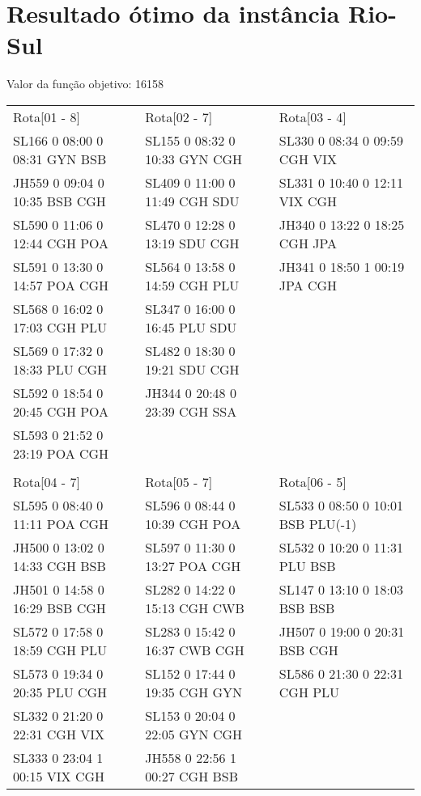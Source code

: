\chapter{Resultado ótimo da instância Rio-Sul}\label{anx:resultriosul}

Valor da função objetivo: 16158

\begin{scriptsize}

\begin{longtable}{l l l}

Rota[01 - 8]  & Rota[02 - 7]  & Rota[03 - 4] \\
SL166  0 08:00 0 08:31 GYN BSB & SL155  0 08:32 0 10:33 GYN CGH & SL330  0 08:34 0 09:59 CGH VIX\\
JH559  0 09:04 0 10:35 BSB CGH & SL409  0 11:00 0 11:49 CGH SDU & SL331  0 10:40 0 12:11 VIX CGH\\
SL590  0 11:06 0 12:44 CGH POA & SL470  0 12:28 0 13:19 SDU CGH & JH340  0 13:22 0 18:25 CGH JPA\\
SL591  0 13:30 0 14:57 POA CGH & SL564  0 13:58 0 14:59 CGH PLU & JH341  0 18:50 1 00:19 JPA CGH\\
SL568  0 16:02 0 17:03 CGH PLU & SL347  0 16:00 0 16:45 PLU SDU & \\
SL569  0 17:32 0 18:33 PLU CGH & SL482  0 18:30 0 19:21 SDU CGH & \\
SL592  0 18:54 0 20:45 CGH POA & JH344  0 20:48 0 23:39 CGH SSA & \\
SL593  0 21:52 0 23:19 POA CGH &  & \\

& & \\

Rota[04 - 7]  & Rota[05 - 7]  & Rota[06 - 5] \\
SL595  0 08:40 0 11:11 POA CGH & SL596  0 08:44 0 10:39 CGH POA & SL533  0 08:50 0 10:01 BSB PLU(-1)\\
JH500  0 13:02 0 14:33 CGH BSB & SL597  0 11:30 0 13:27 POA CGH & SL532  0 10:20 0 11:31 PLU BSB\\
JH501  0 14:58 0 16:29 BSB CGH & SL282  0 14:22 0 15:13 CGH CWB & SL147  0 13:10 0 18:03 BSB BSB\\
SL572  0 17:58 0 18:59 CGH PLU & SL283  0 15:42 0 16:37 CWB CGH & JH507  0 19:00 0 20:31 BSB CGH\\
SL573  0 19:34 0 20:35 PLU CGH & SL152  0 17:44 0 19:35 CGH GYN & SL586  0 21:30 0 22:31 CGH PLU\\
SL332  0 21:20 0 22:31 CGH VIX & SL153  0 20:04 0 22:05 GYN CGH & \\
SL333  0 23:04 1 00:15 VIX CGH & JH558  0 22:56 1 00:27 CGH BSB & \\



\end{longtable}
\end{scriptsize}
